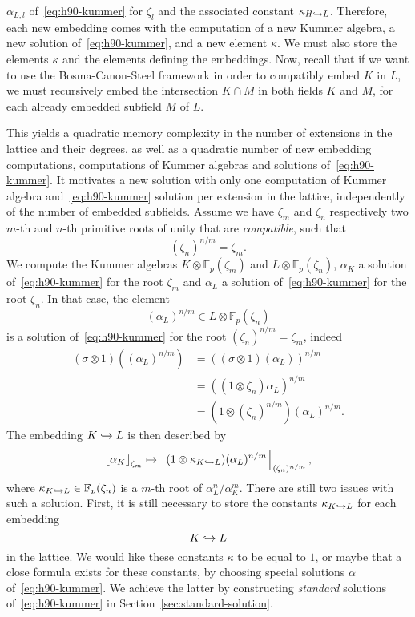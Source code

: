 $\alpha_{L, l}$ of~\eqref{eq:h90-kummer} for $\zeta_l$ and the associated
constant $\kappa_{H\hookrightarrow L}$. Therefore, each new embedding comes with the
computation of a new Kummer algebra, a new solution of~\eqref{eq:h90-kummer}, and a
new element $\kappa$. We must also store the elements $\kappa$ and the elements
defining the embeddings. Now, recall that if we want to use the Bosma-Canon-Steel
framework in order to compatibly embed $K$ in $L$, we must recursively embed
the intersection $K\cap M$ in both fields $K$ and $M$, for each already
embedded subfield $M$ of $L$. 
\begin{center}
\end{center}
This yields a quadratic memory complexity in the number of extensions in the
lattice and their degrees, as well as a quadratic number of new embedding
computations, \ie computations of Kummer algebras and solutions
of~\eqref{eq:h90-kummer}. It motivates a new solution with only one computation
of Kummer algebra and~\eqref{eq:h90-kummer} solution per extension in the lattice,
independently of the number of embedded subfields. Assume we have $\zeta_m$ and
$\zeta_n$ respectively two $m$-th and $n$-th primitive roots
of unity that are \emph{compatible}, \ie such that
\[
  (\zeta_n)^{n/m} = \zeta_m.
\]
We compute the Kummer algebras $K\otimes\mathbb{F}_{p}(\zeta_m)$ and
$L\otimes\mathbb{F}_p(\zeta_n)$, $\alpha_K$ a solution of~\eqref{eq:h90-kummer}
for the root $\zeta_m$ and $\alpha_L$ a solution of~\eqref{eq:h90-kummer} for
the root $\zeta_n$. In that case, the element
\[
  (\alpha_L)^{n/m}\in L\otimes\mathbb{F}_p(\zeta_n)
\]
is a solution of~\eqref{eq:h90-kummer} for the root $(\zeta_n)^{n/m}=\zeta_m$,
indeed
\begin{align*}
  (\sigma\otimes1)((\alpha_L)^{n/m}) &=
  ( (\sigma\otimes1)(\alpha_{L}))^{n/m} \\
  &= ( (1\otimes\zeta_n)\alpha_L)^{n/m}\\
  &= (1\otimes (\zeta_n)^{n/m})(\alpha_L)^{n/m}.
\end{align*}
The embedding $K\hookrightarrow L$ is then described by
\[
  \left\lfloor \alpha_K \right\rfloor_{\zeta_m}\mapsto\left\lfloor (1\otimes\kappa_{K\hookrightarrow
  L})(\alpha_L)^{n/m} \right\rfloor_{(\zeta_n)^{n/m}},
\]
where $\kappa_{K\hookrightarrow L}\in\mathbb{F}_p(\zeta_n)$ is a $m$-th root of
$\alpha_L^n/\alpha_K^m$. There are still two issues with such a solution. First,
it is still necessary to store the constants $\kappa_{K\hookrightarrow L}$ for each
embedding
\[
  K\hookrightarrow L
\]
in the lattice. We would like these constants $\kappa$ to be equal to $1$, or
maybe that a close formula exists for these constants, by choosing special
solutions $\alpha$ of~\eqref{eq:h90-kummer}. We achieve the latter
by constructing \emph{standard} solutions of~\eqref{eq:h90-kummer} in
Section~\ref{sec:standard-solution}.

